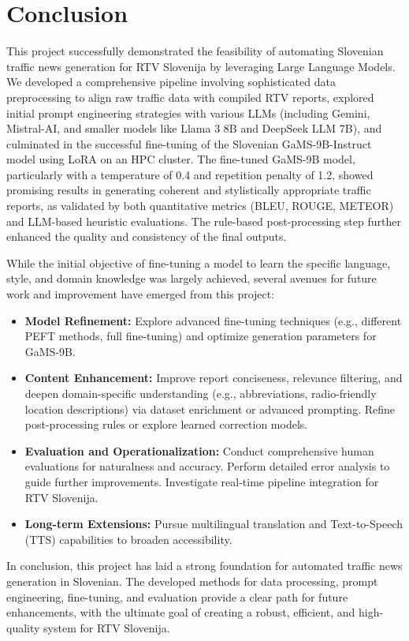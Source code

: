 \documentclass[fleqn,moreauthors,10pt]{ds_report}
\begin{document}
\section*{Conclusion}

This project successfully demonstrated the feasibility of automating Slovenian traffic news generation for RTV Slovenija by leveraging Large Language Models. We developed a comprehensive pipeline involving sophisticated data preprocessing to align raw traffic data with compiled RTV reports, explored initial prompt engineering strategies with various LLMs (including Gemini, Mistral-AI, and smaller models like Llama 3 8B and DeepSeek LLM 7B), and culminated in the successful fine-tuning of the Slovenian GaMS-9B-Instruct model using LoRA on an HPC cluster. The fine-tuned GaMS-9B model, particularly with a temperature of 0.4 and repetition penalty of 1.2, showed promising results in generating coherent and stylistically appropriate traffic reports, as validated by both quantitative metrics (BLEU, ROUGE, METEOR) and LLM-based heuristic evaluations. The rule-based post-processing step further enhanced the quality and consistency of the final outputs.

While the initial objective of fine-tuning a model to learn the specific language, style, and domain knowledge was largely achieved, several avenues for future work and improvement have emerged from this project:

\begin{itemize}
\item \textbf{Model Refinement:} Explore advanced fine-tuning techniques (e.g., different PEFT methods, full fine-tuning) and optimize generation parameters for GaMS-9B.
\item \textbf{Content Enhancement:} Improve report conciseness, relevance filtering, and deepen domain-specific understanding (e.g., abbreviations, radio-friendly location descriptions) via dataset enrichment or advanced prompting. Refine post-processing rules or explore learned correction models.
\item \textbf{Evaluation and Operationalization:} Conduct comprehensive human evaluations for naturalness and accuracy. Perform detailed error analysis to guide further improvements. Investigate real-time pipeline integration for RTV Slovenija.
\item \textbf{Long-term Extensions:} Pursue multilingual translation and Text-to-Speech (TTS) capabilities to broaden accessibility.
\end{itemize}
In conclusion, this project has laid a strong foundation for automated traffic news generation in Slovenian. The developed methods for data processing, prompt engineering, fine-tuning, and evaluation provide a clear path for future enhancements, with the ultimate goal of creating a robust, efficient, and high-quality system for RTV Slovenija.
\end{document}
